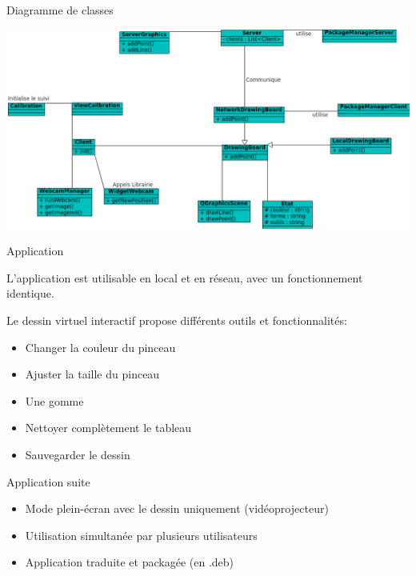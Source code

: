 \documentclass{beamer}
\begin{document}
            \begin{frame}{Diagramme de classes}
                  \begin{center}            
                  \includegraphics[scale=0.45]{../uml/classes.png}
                  \end{center}
            \end{frame}
            
            \begin{frame}{Application}
                  
                  L'application est utilisable en local et en réseau, avec un fonctionnement identique.
                  
                  Le dessin virtuel interactif propose différents outils et fonctionnalités:
       \begin{itemize}
        \item Changer la couleur du pinceau
        \item Ajuster la taille du pinceau
        \item Une gomme
        \item Nettoyer complètement le tableau
        \item Sauvegarder le dessin
      \end{itemize}
            \end{frame}
      
      \begin{frame}{Application suite}
        \begin{itemize}
          \item Mode plein-écran avec le dessin uniquement (vidéoprojecteur)
          \item Utilisation simultanée par plusieurs utilisateurs
          \item Application traduite et packagée (en .deb)
        \end{itemize}
      \end{frame}
      
\end{document}
